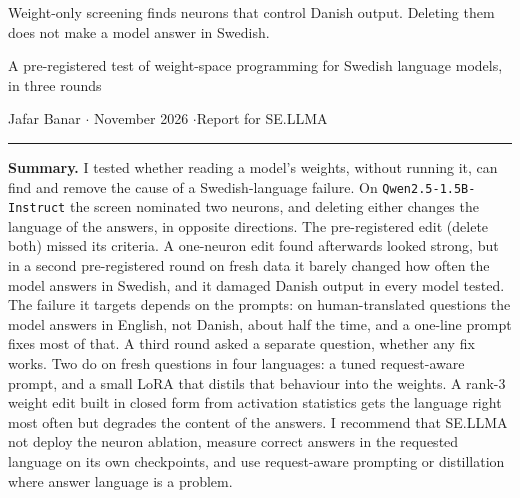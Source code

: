 \documentclass[10pt,a4paper]{article}
\newcommand{\code}[1]{{\small\texttt{#1}}}
\begin{document}
{\LARGE\bfseries\raggedright Weight-only screening finds neurons that control Danish output. Deleting them does not make a model answer in Swedish.\par}
\vspace{4pt}
{\large A pre-registered test of weight-space programming for Swedish language models, in three rounds\par}
\vspace{4pt}
Jafar Banar \quad$\cdot$ November 2026 \quad$\cdot$\quad Report for SE.LLMA

\vspace{4pt}\hrule\vspace{6pt}

\textbf{Summary.}
I tested whether reading a model's weights, without running it, can find and remove the cause of a Swedish-language failure.
On \code{Qwen2.5-1.5B-Instruct} the screen nominated two neurons, and deleting either changes the language of the answers, in opposite directions.
The pre-registered edit (delete both) missed its criteria. A one-neuron edit found afterwards looked strong, but in a second pre-registered round on fresh data
it barely changed how often the model answers in Swedish, and it damaged Danish output in every model tested.
The failure it targets depends on the prompts: on human-translated questions the model answers in English, not Danish, about half the time, and a one-line prompt fixes most of that.
A third round asked a separate question, whether any fix works. Two do on fresh questions in four languages: a tuned request-aware prompt, and a small LoRA that distils that behaviour into the weights. A rank-3 weight edit built in closed form from activation statistics gets the language right most often but degrades the content of the answers.
I recommend that SE.LLMA not deploy the neuron ablation, measure correct answers in the requested language on its own checkpoints, and use request-aware prompting or distillation where answer language is a problem.
\end{document}
